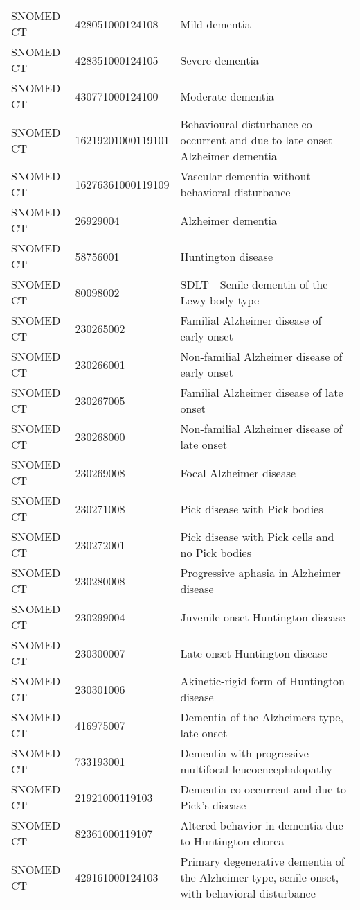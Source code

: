 \begin{longtable}{p{}p{}p{}}
  SNOMED CT & 428051000124108 & Mild dementia \\ 
  SNOMED CT & 428351000124105 & Severe dementia \\ 
  SNOMED CT & 430771000124100 & Moderate dementia \\ 
  SNOMED CT & 16219201000119101 & Behavioural disturbance co-occurrent and due to late onset Alzheimer dementia \\ 
  SNOMED CT & 16276361000119109 & Vascular dementia without behavioral disturbance \\ 
  SNOMED CT & 26929004 & Alzheimer dementia \\ 
  SNOMED CT & 58756001 & Huntington disease \\ 
  SNOMED CT & 80098002 & SDLT - Senile dementia of the Lewy body type \\ 
  SNOMED CT & 230265002 & Familial Alzheimer disease of early onset \\ 
  SNOMED CT & 230266001 & Non-familial Alzheimer disease of early onset \\ 
  SNOMED CT & 230267005 & Familial Alzheimer disease of late onset \\ 
  SNOMED CT & 230268000 & Non-familial Alzheimer disease of late onset \\ 
  SNOMED CT & 230269008 & Focal Alzheimer disease \\ 
  SNOMED CT & 230271008 & Pick disease with Pick bodies \\ 
  SNOMED CT & 230272001 & Pick disease with Pick cells and no Pick bodies \\ 
  SNOMED CT & 230280008 & Progressive aphasia in Alzheimer disease \\ 
  SNOMED CT & 230299004 & Juvenile onset Huntington disease \\ 
  SNOMED CT & 230300007 & Late onset Huntington disease \\ 
  SNOMED CT & 230301006 & Akinetic-rigid form of Huntington disease \\ 
  SNOMED CT & 416975007 & Dementia of the Alzheimers type, late onset \\ 
  SNOMED CT & 733193001 & Dementia with progressive multifocal leucoencephalopathy \\ 
  SNOMED CT & 21921000119103 & Dementia co-occurrent and due to Pick's disease \\ 
  SNOMED CT & 82361000119107 & Altered behavior in dementia due to Huntington chorea \\ 
  SNOMED CT & 429161000124103 & Primary degenerative dementia of the Alzheimer type, senile onset, with behavioral disturbance \\ 

\end{longtable}
